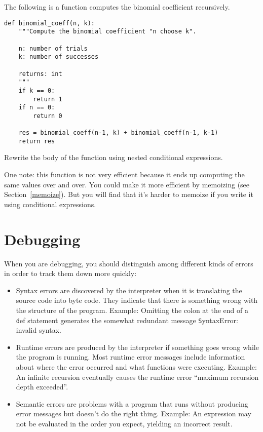 \documentclass[
DIV=11,
fontsize=13,
twoside,
headinclude=false,
titlepage=firstiscover,
abstract=true,
headsepline=true,
footsepline=true,
chapterprefix=true, %
headings=big,
bibliography=totoc,%
captions=tableheading
]{scrbook}
\theoremstyle{definition}
\begin{document}
\begin{exercise}
\normalfont

The following is a function computes the binomial
coefficient recursively.

\begin{lstlisting}
def binomial_coeff(n, k):
    """Compute the binomial coefficient "n choose k".

    n: number of trials
    k: number of successes

    returns: int
    """
    if k == 0:
        return 1
    if n == 0:
        return 0

    res = binomial_coeff(n-1, k) + binomial_coeff(n-1, k-1)
    return res
\end{lstlisting}

Rewrite the body of the function using nested conditional
expressions.

One note: this function is not very efficient because it ends up computing
the same values over and over.  You could make it more efficient by
memoizing (see Section~\ref{memoize}).  But you will find that it's harder to
memoize if you write it using conditional expressions.

\end{exercise}



\appendix

\chapter{Debugging}

When you are debugging, you should distinguish among different
kinds of errors in order to track them down more quickly:

\begin{itemize}

\item Syntax errors are discovered by the interpreter when it is
  translating the source code into byte code.  They indicate
  that there is something wrong with the structure of the program.
  Example: Omitting the colon at the end of a {\texttt def} statement
  generates the somewhat redundant message {\texttt SyntaxError: invalid
    syntax}.

\item Runtime errors are produced by the interpreter if something goes
  wrong while the program is running.  Most runtime error messages
  include information about where the error occurred and what
  functions were executing.  Example: An infinite recursion eventually
  causes the runtime error ``maximum recursion depth exceeded''.

\item Semantic errors are problems with a program that runs without
  producing error messages but doesn't do the right thing.  Example:
  An expression may not be evaluated in the order you expect, yielding
  an incorrect result.

\end{itemize}
\end{document}
